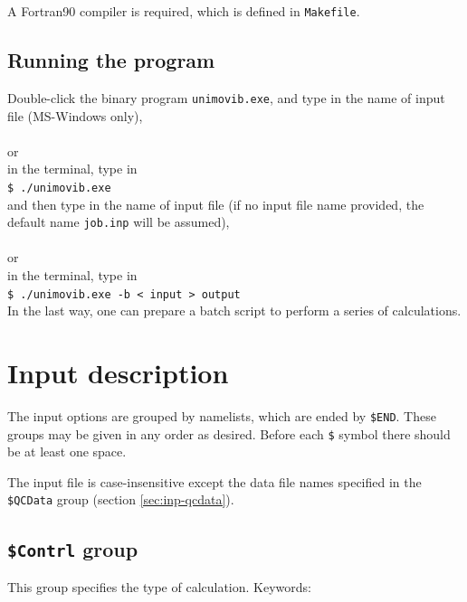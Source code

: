 \documentclass[12pt,english]{extarticle}
\begin{document}
A Fortran90 compiler is required, which is defined in \verb|Makefile|.


\subsection{Running the program} \label{sec:run}

Double-click the binary program \verb|unimovib.exe|, and type in the name of input file (MS-Windows only), \\ \\
or \\
in the terminal, type in \\
\verb|$ ./unimovib.exe | \\
and then type in the name of input file (if no input file name provided, the default name \verb|job.inp| will be assumed), \\ \\
or \\
in the terminal, type in \\
\verb|$ ./unimovib.exe -b < input > output | \\

In the last way, one can prepare a batch script to perform a series of calculations.

\pagebreak{}


\section{Input description} \label{part:input}

The input options are grouped by namelists, which are ended by \verb|$END|.
These groups may be given in any order as desired. Before each \verb|$| symbol
there should be at least one space.

The input file is case-insensitive except the data file names specified in the \verb|$QCData|
group (section \ref{sec:inp-qcdata}).

\subsection{\texttt{\$Contrl} group} \label{sec:inp-contrl}

This group specifies the type of calculation. Keywords:
\end{document}
